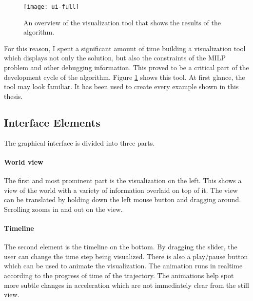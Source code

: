 \begin{figure}
	\centering
    \texttt{[image: ui-full]}
    \caption[An overview of the visualization tool]{An overview of the visualization tool that shows the results of the algorithm.}
    \label{fig:ui-full}     
\end{figure}

For this reason, I spent a significant amount of time building a visualization tool which displays not only the solution, but also the constraints of the MILP problem and other debugging information. This proved to be a critical part of the development cycle of the algorithm. Figure \ref{fig:ui-full} shows this tool. At first glance, the tool may look familiar. It has been used to create every example shown in this thesis. 
\subsection{Interface Elements}
The graphical interface is divided into three parts.

\paragraph{World view}The first and most prominent part is the visualization on the left. This shows a view of the world with a variety of information overlaid on top of it. The view can be translated by holding down the left mouse button and dragging around. Scrolling zooms in and out on the view.

\paragraph{Timeline}The second element is the timeline on the bottom. By dragging the slider, the user can change the time step being visualized. There is also a play/pause button which can be used to animate the visualization. The animation runs in realtime according to the progress of time of the trajectory. The animations help spot more subtle changes in acceleration which are not immediately clear from the still view.

